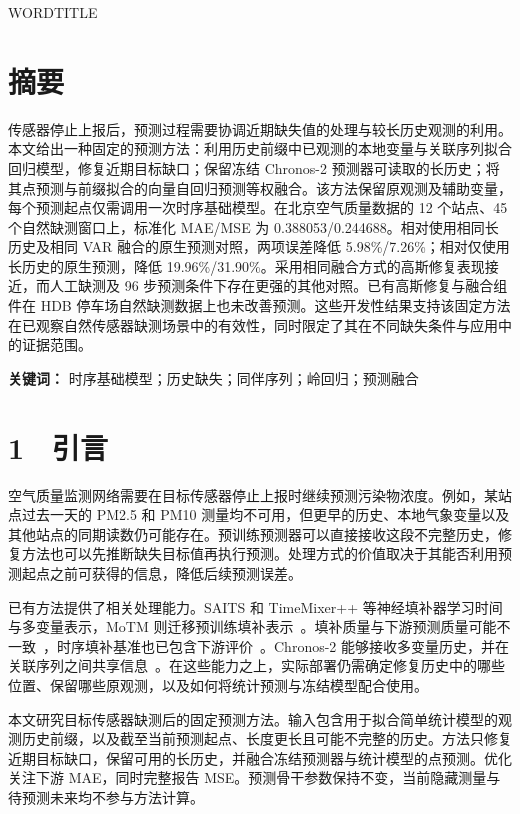 
WORDTITLE


\section{摘要}
传感器停止上报后，预测过程需要协调近期缺失值的处理与较长历史观测的利用。本文给出一种固定的预测方法：利用历史前缀中已观测的本地变量与关联序列拟合回归模型，修复近期目标缺口；保留冻结 Chronos-2 预测器可读取的长历史；将其点预测与前缀拟合的向量自回归预测等权融合。该方法保留原观测及辅助变量，每个预测起点仅需调用一次时序基础模型。在北京空气质量数据的 12 个站点、45 个自然缺测窗口上，标准化 MAE/MSE 为 0.388053/0.244688。相对使用相同长历史及相同 VAR 融合的原生预测对照，两项误差降低 5.98\%/7.26\%；相对仅使用长历史的原生预测，降低 19.96\%/31.90\%。采用相同融合方式的高斯修复表现接近，而人工缺测及 96 步预测条件下存在更强的其他对照。已有高斯修复与融合组件在 HDB 停车场自然缺测数据上也未改善预测。这些开发性结果支持该固定方法在已观察自然传感器缺测场景中的有效性，同时限定了其在不同缺失条件与应用中的证据范围。


\textbf{关键词：} 时序基础模型；历史缺失；同伴序列；岭回归；预测融合


\section{1　引言}


空气质量监测网络需要在目标传感器停止上报时继续预测污染物浓度。例如，某站点过去一天的 PM2.5 和 PM10 测量均不可用，但更早的历史、本地气象变量以及其他站点的同期读数仍可能存在。预训练预测器可以直接接收这段不完整历史，修复方法也可以先推断缺失目标值再执行预测。处理方式的价值取决于其能否利用预测起点之前可获得的信息，降低后续预测误差。

已有方法提供了相关处理能力。SAITS 和 TimeMixer++ 等神经填补器学习时间与多变量表示，MoTM 则迁移预训练填补表示~\citep{du2023saits,wang2025timemixerpp,motmsoftware}。填补质量与下游预测质量可能不一致~\citep{lemorvan2021good}，时序填补基准也已包含下游评价~\citep{du2024tsibench}。Chronos-2 能够接收多变量历史，并在关联序列之间共享信息~\citep{ansari2025chronos2}。在这些能力之上，实际部署仍需确定修复历史中的哪些位置、保留哪些原观测，以及如何将统计预测与冻结模型配合使用。

本文研究目标传感器缺测后的固定预测方法。输入包含用于拟合简单统计模型的观测历史前缀，以及截至当前预测起点、长度更长且可能不完整的历史。方法只修复近期目标缺口，保留可用的长历史，并融合冻结预测器与统计模型的点预测。优化关注下游 MAE，同时完整报告 MSE。预测骨干参数保持不变，当前隐藏测量与待预测未来均不参与方法计算。

